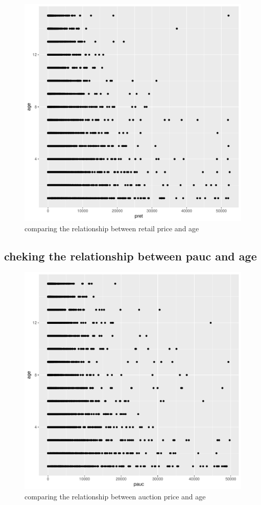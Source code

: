 \documentclass[11pt]{book}
\begin{document}
\begin{figure}[h!]
  \centering
  \includegraphics[scale = 0.5, keepaspectratio=true]{../Figures/pret_age_plot}
  \caption{comparing the relationship between retail price and age} \label{fig:pret_age_plot}
\end{figure}

\clearpage
\pagebreak



\subsection*{cheking the relationship between pauc and age }




\begin{figure}[h!]
  \centering
  \includegraphics[scale = 0.5, keepaspectratio=true]{../Figures/pauc_age_plot}
  \caption{comparing the relationship between auction price and age} \label{fig:pauct_age_plot}
\end{figure}







\end{document}
